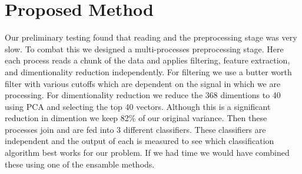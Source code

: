 \section{Proposed Method}
\label{sec:proposed_method}

Our preliminary testing found that reading and the preprocessing stage
was very slow.
To combat this we designed a multi-processes preprocessing stage.
Here each process reads a chunk of the data and applies filtering,
feature extraction, and dimentionality reduction independently.
For filtering we use a butter worth filter with various cutoffs which are dependent on the signal in which we are processing.
For dimentionality reduction we reduce the 368 dimentions to 40 using PCA
and selecting the top 40 vectors.
Although this is a significant reduction in dimention we keep 82\% of our
original variance.
Then these processes join and are fed into 3 different classifiers.
These classifiers are independent and the output of each is measured
to see which classification algorithm best works for our problem.
If we had time we would have combined these using one of the ensamble methods.

